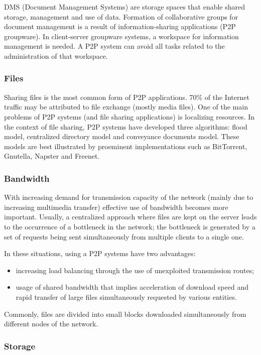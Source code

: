 DMS (Document Management Systems) are storage spaces that enable shared
storage, management and use of data. Formation of collaborative groups for
document management is a result of information-sharing applications (P2P
groupware). In client-server groupware systems, a workspace for
information management is needed. A P2P system can avoid all tasks related to
the administration of that workspace.

\subsubsection{Files}

Sharing files is the most common form of P2P applications. 70\% of the
Internet traffic may be attributed to file exchange (mostly media files). One
of the main problems of P2P systems (and file sharing applications) is
localizing resources. In the context of file sharing, P2P systems have
developed three algorithms: flood model, centralized directory model and
conveyance documents model. These models are best illustrated by proeminent
implementations such as BitTorrent, Gnutella, Napster and Freenet.

\subsubsection{Bandwidth}

With increasing demand for transmission capacity of the network (mainly due to
increasing multimedia transfer) effective use of bandwidth becomes more
important. Usually, a centralized approach where files are kept on the
server leads to the occurrence of a bottleneck in the network; the
bottleneck is generated by a set of requests being sent simultaneously from
multiple clients to a single one.

In these situations, using a P2P systems have two advantages:
\begin{itemize}
  \item increasing load balancing through the use of unexploited transmission
  routes;
  \item usage of shared bandwidth that implies acceleration of download speed
  and rapid transfer of large files simultaneously requested by various
  entities.
\end{itemize}

Commonly, files are divided into small blocks downloaded simultaneously from
different nodes of the network.

\subsubsection{Storage}

